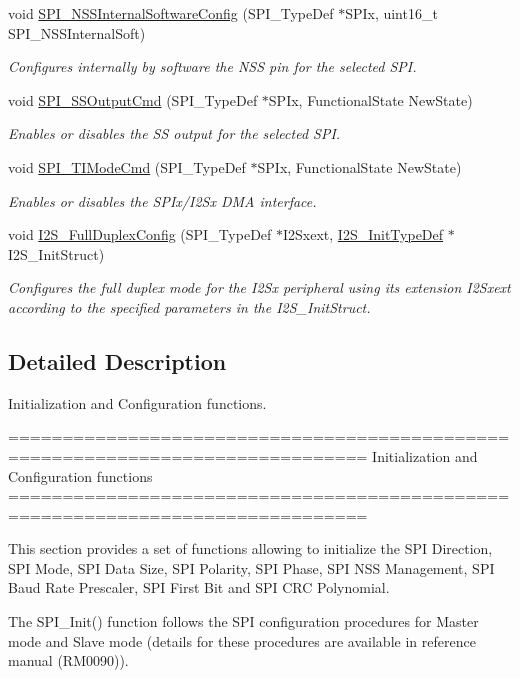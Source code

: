 \begin{DoxyCompactItemize}
void \hyperlink{group___s_p_i___group1_ga56fc508a482f032f9eb80e4c63184126}{S\-P\-I\-\_\-\-N\-S\-S\-Internal\-Software\-Config} (S\-P\-I\-\_\-\-Type\-Def $\ast$S\-P\-Ix, uint16\-\_\-t S\-P\-I\-\_\-\-N\-S\-S\-Internal\-Soft)
\begin{DoxyCompactList}\small\item\em Configures internally by software the N\-S\-S pin for the selected S\-P\-I. \end{DoxyCompactList}\item 
void \hyperlink{group___s_p_i___group1_ga4ec54abdedf6cd17403d853a926d91c1}{S\-P\-I\-\_\-\-S\-S\-Output\-Cmd} (S\-P\-I\-\_\-\-Type\-Def $\ast$S\-P\-Ix, Functional\-State New\-State)
\begin{DoxyCompactList}\small\item\em Enables or disables the S\-S output for the selected S\-P\-I. \end{DoxyCompactList}\item 
void \hyperlink{group___s_p_i___group1_ga74594bf32e3bf4905ac7a2deef8eb475}{S\-P\-I\-\_\-\-T\-I\-Mode\-Cmd} (S\-P\-I\-\_\-\-Type\-Def $\ast$S\-P\-Ix, Functional\-State New\-State)
\begin{DoxyCompactList}\small\item\em Enables or disables the S\-P\-Ix/\-I2\-Sx D\-M\-A interface. \end{DoxyCompactList}\item 
void \hyperlink{group___s_p_i___group1_ga60082947bedfe9efc233405be2a7bec2}{I2\-S\-\_\-\-Full\-Duplex\-Config} (S\-P\-I\-\_\-\-Type\-Def $\ast$I2\-Sxext, \hyperlink{struct_i2_s___init_type_def}{I2\-S\-\_\-\-Init\-Type\-Def} $\ast$I2\-S\-\_\-\-Init\-Struct)
\begin{DoxyCompactList}\small\item\em Configures the full duplex mode for the I2\-Sx peripheral using its extension I2\-Sxext according to the specified parameters in the I2\-S\-\_\-\-Init\-Struct. \end{DoxyCompactList}\end{DoxyCompactItemize}


\subsection{Detailed Description}
Initialization and Configuration functions. \begin{DoxyVerb} ===============================================================================
                  Initialization and Configuration functions
 ===============================================================================  

  This section provides a set of functions allowing to initialize the SPI Direction,
  SPI Mode, SPI Data Size, SPI Polarity, SPI Phase, SPI NSS Management, SPI Baud
  Rate Prescaler, SPI First Bit and SPI CRC Polynomial.
  
  The SPI_Init() function follows the SPI configuration procedures for Master mode
  and Slave mode (details for these procedures are available in reference manual
  (RM0090)).\end{DoxyVerb}
 

